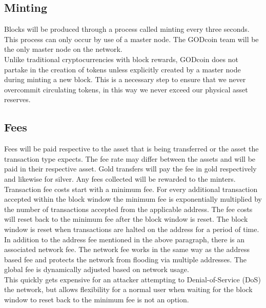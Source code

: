 \documentclass[12pt,a4paper]{article}
\begin{document}
  \subsection{Minting}
  Blocks will be produced through a process called minting every three seconds.
  This process can only occur by use of a master node. The GODcoin team will be
  the only master node on the network.\\

  Unlike traditional cryptocurrencies with block rewards, GODcoin does not
  partake in the creation of tokens unless explicitly created by a master node
  during minting a new block. This is a necessary step to ensure that we never
  overcommit circulating tokens, in this way we never exceed our physical asset
  reserves.

  \subsection{Fees}
  Fees will be paid respective to the asset that is being transferred or the
  asset the transaction type expects. The fee rate may differ between the assets
  and will be paid in their respective asset. Gold transfers will pay the fee in
  gold respectively and likewise for silver. Any fees collected will be rewarded
  to the minters.\\

  Transaction fee costs start with a minimum fee. For every additional
  transaction accepted within the block window the minimum fee is exponentially
  multiplied by the number of transactions accepted from the applicable address.
  The fee costs will reset back to the minimum fee after the block window is
  reset. The block window is reset when transactions are halted on the address
  for a period of time.\\

  In addition to the address fee mentioned in the above paragraph, there is an
  associated  network fee. The network fee works in the same way as
  the address based fee and protects the network from flooding via multiple
  addresses. The global fee is dynamically adjusted based on network usage.\\

  This quickly gets expensive for an attacker attempting to Denial-of-Service
  (DoS) the network, but allows flexibility for a normal user when waiting for
  the block window to reset back to the minimum fee is not an option.\\
\end{document}
